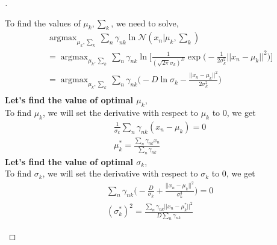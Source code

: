 \documentclass[a4paper, 12pt]{article}
\DeclareMathOperator*{\argmax}{argmax}
\begin{document}
\begin{proof}[]
\begin{enumerate}[label={\color{blue}{\textbf{1.\arabic*})}}]
        To find the values of $\mu_k, \textstyle\sum_k$, we need to solve, 
        \begin{align*}
            &\argmax_{\mu_k, \sum_k} \sum\limits_{n}  \gamma_{nk} \ln{\mathcal{N}(x_n | \mu_k, \textstyle\sum\nolimits_{k})}\\
            &= \argmax_{\mu_k, \sum_k} \sum\limits_{n}  \gamma_{nk} \ln{\bigg[ \frac{1}{(\sqrt{2\pi}\sigma_k)^D}\exp{\bigg( - \frac{1}{2\sigma_k^2}||x_n - \mu_k||^2 \bigg)} \bigg]}\\
            &= \argmax_{\mu_k, \sum_k} \sum\limits_{n}  \gamma_{nk} {\bigg( -D\ln{\sigma_k}  - \frac{||x_n - \mu_k||^2}{2\sigma_k^2} \bigg)} \tag*{(where D is length of $x_n$)}\\
        \end{align*}
        \textbf{Let's find the value of optimal $\mu_k$}, \\
        To find $\mu_k$, we will set the derivative with respect to $\mu_k$ to 0, we get
        \begin{align*}
            &\frac{1}{\sigma_k}\sum_n{\gamma_{nk}(x_n- \mu_k)} = 0\\
            &\mu_k^* = \frac{\textstyle
            \sum\nolimits_n{\gamma_{nk}x_n}}{\sum\nolimits_n{\gamma_{nk}}}
        \end{align*}
       \textbf{Let's find the value of optimal $\sigma_k$}, \\
        To find $\sigma_k$, we will set the derivative with respect to $\sigma_k$ to 0, we get
        \begin{align*}
            &\sum_n{\gamma_{nk}}\bigg(-\frac{D}{\sigma_k} + \frac{||x_n - \mu_k||^2}{\sigma_k^3}\bigg) = 0\\
            &(\sigma_k^*)^2 = \frac{\sum\nolimits_n\gamma_{nk}||x_n - \mu_k^*||^2}{D\sum\nolimits_n\gamma_{nk}}
        \end{align*}
        

\end{enumerate}
\end{proof}
\end{document}
